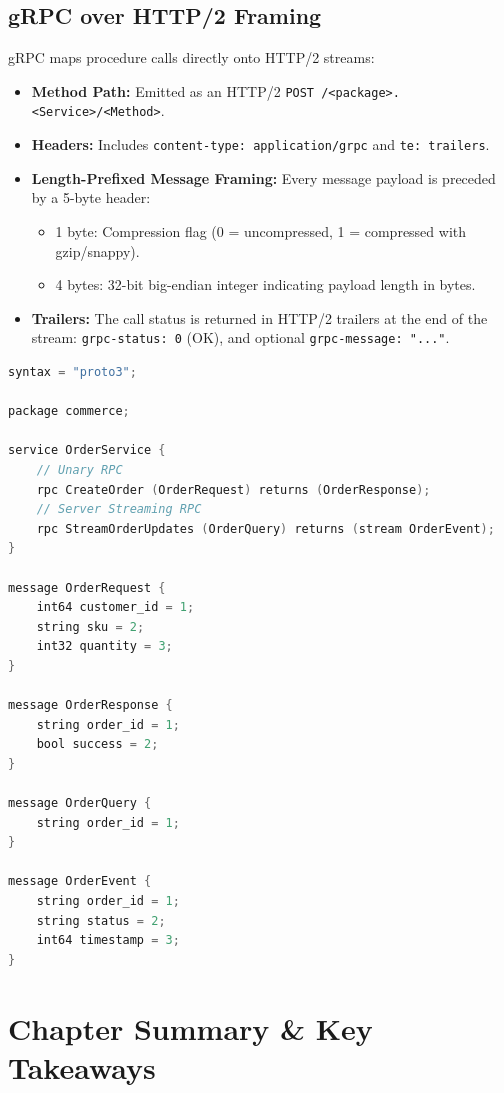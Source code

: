 \subsection{gRPC over HTTP/2 Framing}

gRPC maps procedure calls directly onto HTTP/2 streams:
\begin{itemize}[leftmargin=15pt]
  \item \textbf{Method Path:} Emitted as an HTTP/2 \texttt{POST /<package>.<Service>/<Method>}.
  \item \textbf{Headers:} Includes \texttt{content-type: application/grpc} and \texttt{te: trailers}.
  \item \textbf{Length-Prefixed Message Framing:} Every message payload is preceded by a 5-byte header:
  \begin{itemize}
    \item 1 byte: Compression flag (0 = uncompressed, 1 = compressed with gzip/snappy).
    \item 4 bytes: 32-bit big-endian integer indicating payload length in bytes.
  \end{itemize}
  \item \textbf{Trailers:} The call status is returned in HTTP/2 trailers at the end of the stream: \texttt{grpc-status: 0} (OK), and optional \texttt{grpc-message: "..."}.
\end{itemize}

\begin{lstlisting}[language=C,caption={Protobuf IDL Definition (\texttt{order.proto})}]
syntax = "proto3";

package commerce;

service OrderService {
    // Unary RPC
    rpc CreateOrder (OrderRequest) returns (OrderResponse);
    // Server Streaming RPC
    rpc StreamOrderUpdates (OrderQuery) returns (stream OrderEvent);
}

message OrderRequest {
    int64 customer_id = 1;
    string sku = 2;
    int32 quantity = 3;
}

message OrderResponse {
    string order_id = 1;
    bool success = 2;
}

message OrderQuery {
    string order_id = 1;
}

message OrderEvent {
    string order_id = 1;
    string status = 2;
    int64 timestamp = 3;
}
\end{lstlisting}

\section{Chapter Summary \& Key Takeaways}

